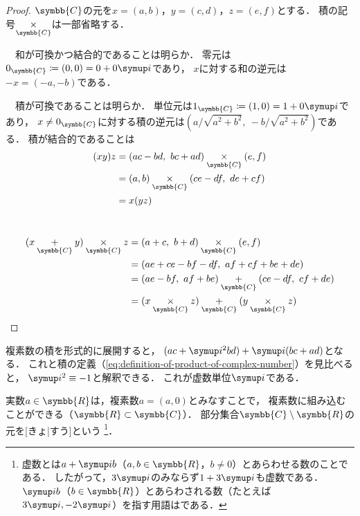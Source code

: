 \documentclass[../sotsu.tex]{subfiles}
\begin{document}
\begin{proof}
    $\symbb{C}$の元を$x = (a, b)$，$y = (c, d)$，$z = (e, f)$とする．
    積の記号$\underset{\symbb{C}}{\times}$は一部省略する．

    　和が可換かつ結合的であることは明らか．
    零元は$0_{\symbb{C}} \coloneq (0, 0) = 0 + 0\iu$であり，
    $x$に対する和の逆元は$-x = (-a, -b)$である．

    　積が可換であることは明らか．
    単位元は$1_{\symbb{C}} \coloneq (1, 0) = 1 + 0\iu$であり，
    $x \neq 0_{\symbb{C}}$に対する積の逆元は$(a / \sqrt{a^2 + b^2}, \  -b / \sqrt{a^2 + b^2} )$である．
    積が結合的であることは
    \begin{equation*}
        \begin{split}
            (xy)z &= (ac-bd, \  bc+ad) \underset{\symbb{C}}{\times} (e, f)   \\
                  &= (a, b) \underset{\symbb{C}}{\times} (ce-df, \  de+cf)   \\
                  &= x(yz)
        \end{split}
    \end{equation*}

    \begin{equation*}
        \begin{split}
            (x \underset{\symbb{C}}{+} y) \underset{\symbb{C}}{\times} z
            &= (a+c, \  b+d) \underset{\symbb{C}}{\times} (e, f)   \\ 
            &= (ae+ce-bf-df, \  af+cf+be+de)   \\
            &= (ae-bf, \  af+be) \underset{\symbb{C}}{+} (ce-df, \  cf+de)   \\
            &= (x \underset{\symbb{C}}{\times} z) \underset{\symbb{C}}{+}
               (y \underset{\symbb{C}}{\times} z)
        \end{split}
    \end{equation*}
\end{proof}

複素数の積を形式的に展開すると，
$(ac + \iu^2 bd) + \iu (bc + ad)$となる．
これと積の定義（\cref{eq:definition-of-product-of-complex-number}）を見比べると，
$\iu^2 \equiv -1$と解釈できる．
これが虚数単位$\iu$である．

実数$a \in \symbb{R}$は，複素数$a = (a, 0)$とみなすことで，
複素数に組み込むことができる（$\symbb{R} \subset \symbb{C}$）．
部分集合$\symbb{C} \setminus \symbb{R}$の元を[きょ|すう]という%
\footnote{
    虚数とは$a + \iu b$（$a, b \in \symbb{R}$，$b \neq 0$）とあらわせる数のことである．
    したがって，$3\iu$のみならず$1 + 3\iu$も虚数である．
    $\iu b$（$b \in \symbb{R}$）とあらわされる数（たとえば$3\iu, -2\iu$）を指す用語はである．
}．
\end{document}
